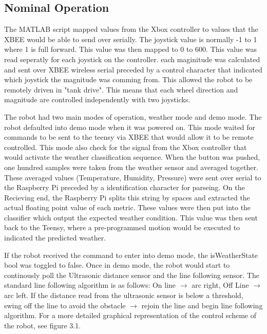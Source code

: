 \documentclass[UTF8]{article}
\begin{document}
\subsection{Nominal Operation}
The MATLAB script mapped values from the Xbox controller to values that the XBEE would be able to send over serially. The joystick value is normally -1 to 1 where 1 is full forward.  This value was then mapped to 0 to 600. This value was read seperatly for each joystick on the controller. each maginitude was calculated and sent over XBEE wireless serial preceded by a control character that indicated which joystick the magnitude was comming from. This allowed the robot to be remotely driven in "tank drive". This means that each wheel direction and magnitude are controlled independently with two joysticks.

\vspace{4mm}
\noindent
The robot had two main modes of operation, weather mode and demo mode. The robot defaulted into demo mode when it was powered on. This mode waited for commands to be sent to the teensy via XBEE that would allow it to be remote controlled. This mode also check for the signal from the Xbox controller that would activate the weather classification sequence. When the button was pushed, one hundred samples were taken from the weather sensor and averaged together. These averaged values (Temperature, Humidity, Pressure) were sent over serial to the Raspberry Pi preceded by a identification character for parseing. On the Recieving end, the Raspberry Pi splits this string by spaces and extracted the actual floating point value of each metric. These values were then put into the classifier which output the expected weather condition. This value was then sent back to the Teensy, where a pre-programmed motion would be executed to indicated the predicted weather.

\vspace{4mm}
\noindent
If the robot received the command to enter into demo mode, the isWeatherState bool was toggled to false. Once in demo mode, the robot would start to continously poll the Ultrasonic distance sensor and the line following sensor. The standard line following algorithm is as follows: On line $\rightarrow$ arc right, Off Line $\rightarrow$ arc left. If the distance read from the ultrasonic sensor is below a threshold, swing off the line to avoid the obstacle $\rightarrow$ rejoin the line and begin line following algorithm. For a more detailed graphical representation of the control scheme of the robot, see figure 3.1.
\end{document}
